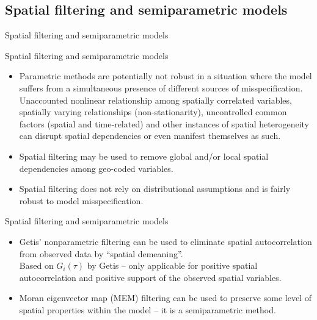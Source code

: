 \documentclass{beamer}
\begin{document}
\subsection{Spatial filtering and semiparametric models}
\begin{frame}{Spatial filtering and semiparametric models}
\end{frame}
\begin{frame}{Spatial filtering and semiparametric models}
\begin{itemize}
    \item Parametric methods are potentially not robust in a situation where the model suffers from a simultaneous presence of different sources of misspecification. \\Unaccounted nonlinear relationship among spatially correlated variables, spatially varying relationships (non-stationarity), uncontrolled common factors (spatial and time-related) and other instances of spatial heterogeneity can disrupt spatial dependencies or even manifest themselves as such. 
    \medskip
    \item Spatial filtering may be used to remove global and/or local spatial dependencies among geo-coded variables. 
    \medskip
    \item Spatial filtering does not rely on distributional assumptions and is fairly robust to model misspecification. 
\end{itemize}
\end{frame}
\begin{frame}{Spatial filtering and semiparametric models}
\begin{itemize}
    \item Getis' nonparametric filtering can be used to eliminate spatial autocorrelation from observed data by ``spatial demeaning''. \\Based on $G_i(\tau)$ by Getis -- only applicable for positive spatial autocorrelation and positive support of the observed spatial variables.
    \bigskip
    \item Moran eigenvector map (MEM) filtering can be used to preserve some level of spatial properties within the model -- it is a semiparametric method.
\end{itemize}
\end{frame}
\end{document}
